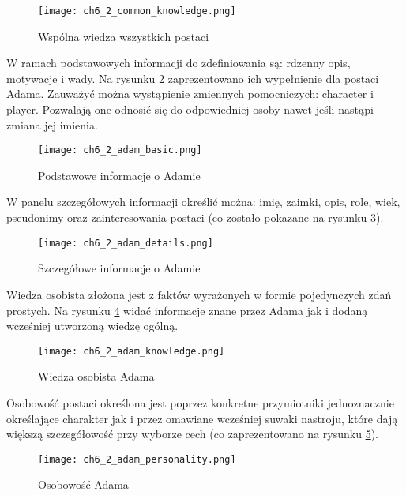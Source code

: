 \begin{figure}[h!]
    \centering
    \texttt{[image: ch6\_2\_common\_knowledge.png]}
    \caption{Wspólna wiedza wszystkich postaci}
    \label{fig:ch6_2_common_knowledge}
\end{figure}

\newpage

W ramach podstawowych informacji do zdefiniowania są: rdzenny opis, motywacje i wady. Na rysunku
\ref{fig:ch6_2_adam_basic} zaprezentowano ich wypełnienie dla postaci Adama. Zauważyć można wystąpienie
zmiennych pomocniczych: {character} i {player}. Pozwalają one odnosić się do odpowiedniej osoby nawet
jeśli nastąpi zmiana jej imienia.

\begin{figure}[h!]
    \centering
    \texttt{[image: ch6\_2\_adam\_basic.png]}
    \caption{Podstawowe informacje o Adamie}
    \label{fig:ch6_2_adam_basic}
\end{figure}

\newpage

W panelu szczegółowych informacji określić można: imię, zaimki, opis, role, wiek, pseudonimy oraz
zainteresowania postaci (co zostało pokazane na rysunku \ref{fig:ch6_2_adam_details}).

\begin{figure}[h!]
    \centering
    \texttt{[image: ch6\_2\_adam\_details.png]}
    \caption{Szczegółowe informacje o Adamie}
    \label{fig:ch6_2_adam_details}
\end{figure}

\newpage

Wiedza osobista złożona jest z faktów wyrażonych w formie pojedynczych zdań prostych. Na rysunku
\ref{fig:ch6_2_adam_knowledge} widać informacje znane przez Adama jak i dodaną wcześniej utworzoną
wiedzę ogólną.

\begin{figure}[h!]
    \centering
    \texttt{[image: ch6\_2\_adam\_knowledge.png]}
    \caption{Wiedza osobista Adama}
    \label{fig:ch6_2_adam_knowledge}
\end{figure}

Osobowość postaci określona jest poprzez konkretne przymiotniki jednoznacznie określające charakter jak i
przez omawiane wcześniej suwaki nastroju, które dają większą szczegółowość przy wyborze cech (co
zaprezentowano na rysunku \ref{fig:ch6_2_adam_personality}).

\begin{figure}[h!]
    \centering
    \texttt{[image: ch6\_2\_adam\_personality.png]}
    \caption{Osobowość Adama}
    \label{fig:ch6_2_adam_personality}
\end{figure}

